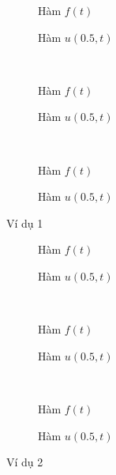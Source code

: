 \documentclass[]{article}
\begin{document}
\begin{figure}[t!]
	\begin{subfigure}{.5\linewidth}
		\centering
		\caption{Hàm $f(t)$}
		\label{f010}
	\end{subfigure}%
	\begin{subfigure}{.5\linewidth}
		\centering
		\caption{Hàm $u(0.5, t)$}
		\label{u010}
	\end{subfigure}
	\\
	\begin{subfigure}{.5\linewidth}
		\centering
		\caption{Hàm $f(t)$}
		\label{f015}
	\end{subfigure}%
	\begin{subfigure}{.5\linewidth}
		\centering
		\caption{Hàm $u(0.5, t)$}
		\label{u015}
	\end{subfigure}
	\\
	\begin{subfigure}{.5\linewidth}
		\centering
		\caption{Hàm $f(t)$}
		\label{f020}
	\end{subfigure}%
	\begin{subfigure}{.5\linewidth}
		\centering
		\caption{Hàm $u(0.5, t)$}
		\label{u020}
	\end{subfigure}
	\caption{Ví dụ 1}
	\label{ex1}
\end{figure}


\begin{figure}[t!]
	\begin{subfigure}{.5\linewidth}
		\centering
		\caption{Hàm $f(t)$}
		\label{f110}
	\end{subfigure}%
	\begin{subfigure}{.5\linewidth}
		\centering
		\caption{Hàm $u(0.5, t)$}
		\label{u110}
	\end{subfigure}
	\\
	\begin{subfigure}{.5\linewidth}
		\centering
		\caption{Hàm $f(t)$}
		\label{f115}
	\end{subfigure}%
	\begin{subfigure}{.5\linewidth}
		\centering
		\caption{Hàm $u(0.5, t)$}
		\label{u115}
	\end{subfigure}
	\\
	\begin{subfigure}{.5\linewidth}
		\centering
		\caption{Hàm $f(t)$}
		\label{f120}
	\end{subfigure}%
	\begin{subfigure}{.5\linewidth}
		\centering
		\caption{Hàm $u(0.5, t)$}
		\label{u120}
	\end{subfigure}
	\caption{Ví dụ 2}
	\label{ex2}
\end{figure}
\end{document}
